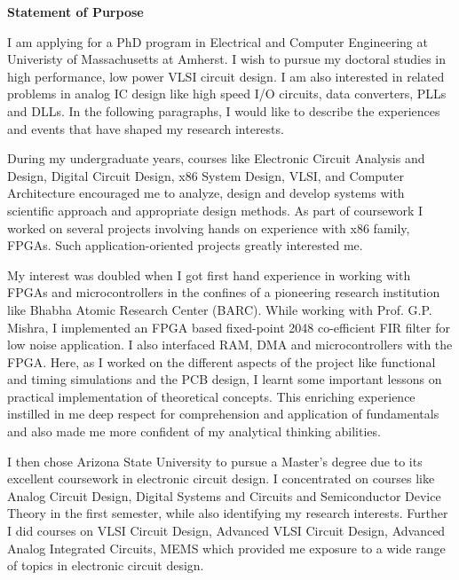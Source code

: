 \documentclass[letterpaper, 10pt]{article}
\begin{document}
\begin{center}
\vspace*{0.05in}
{\Large \textbf{Statement of Purpose}}
\end{center}
\vspace*{0.2in}

I am applying for a PhD program in Electrical and Computer Engineering at Univeristy of Massachusetts at Amherst. I wish to pursue my doctoral studies in high performance, low power VLSI circuit design. I am also interested in related problems in analog IC design like high speed I/O circuits, data converters, PLLs and DLLs. In the following paragraphs, I would like to describe the experiences and events that have shaped my research interests.

During my undergraduate years, courses like Electronic Circuit Analysis and Design, Digital Circuit Design, x86 System Design, VLSI, and Computer Architecture encouraged me to analyze, design and develop systems with scientific approach and appropriate design methods. As part of coursework I worked on several projects involving hands on experience with x86 family, FPGAs. Such application-oriented projects greatly interested me.

My interest was doubled when I got first hand experience in working with FPGAs and microcontrollers in the confines of a pioneering research institution like Bhabha Atomic Research Center (BARC). While working with Prof. G.P. Mishra, I implemented an FPGA based fixed-point 2048 co-efficient FIR filter for low noise application. I also interfaced RAM, DMA and microcontrollers with the FPGA.  Here, as I worked on the different aspects of the project like functional and timing simulations and the PCB design, I learnt some important lessons on practical implementation of theoretical concepts. This enriching experience instilled in me deep respect for comprehension and application of fundamentals and also made me more confident of my analytical thinking abilities.

I then chose Arizona State University to pursue a Master’s degree due to its excellent coursework in electronic circuit design. I concentrated on courses like Analog Circuit Design, Digital Systems and Circuits and Semiconductor Device Theory in the first semester, while also identifying my research interests. Further I did courses on VLSI Circuit Design, Advanced VLSI Circuit Design, Advanced Analog Integrated Circuits, MEMS which provided me exposure to a wide range of topics in electronic circuit design.
\end{document}
